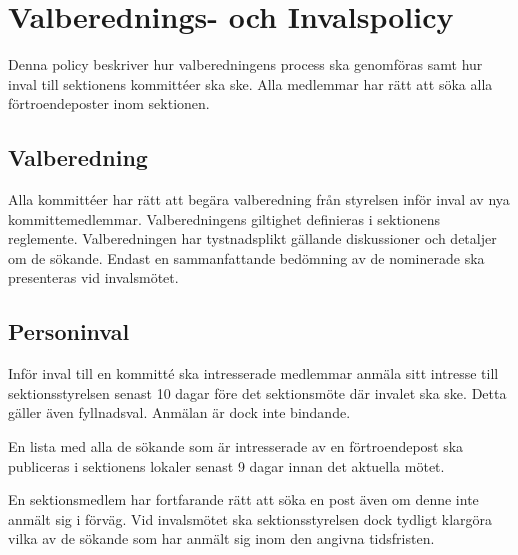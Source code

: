 

\section{Valberednings- och Invalspolicy}

Denna policy beskriver hur valberedningens process ska genomföras samt hur inval till sektionens kommittéer ska ske. Alla medlemmar har rätt att söka alla förtroendeposter inom sektionen.

\subsection{Valberedning} Alla kommittéer har rätt att begära valberedning från styrelsen inför inval av nya kommittemedlemmar. Valberedningens giltighet definieras i sektionens reglemente. Valberedningen har tystnadsplikt gällande diskussioner och detaljer om de sökande. Endast en sammanfattande bedömning av de nominerade ska presenteras vid invalsmötet.

\subsection{Personinval} Inför inval till en kommitté ska intresserade medlemmar anmäla sitt intresse till sektionsstyrelsen senast 10 dagar före det sektionsmöte där invalet ska ske. Detta gäller även fyllnadsval. Anmälan är dock inte bindande.

En lista med alla de sökande som är intresserade av en förtroendepost ska publiceras i sektionens lokaler senast 9 dagar innan det aktuella mötet.

En sektionsmedlem har fortfarande rätt att söka en post även om denne inte anmält sig i förväg. Vid invalsmötet ska sektionsstyrelsen dock tydligt klargöra vilka av de sökande som har anmält sig inom den angivna tidsfristen.

